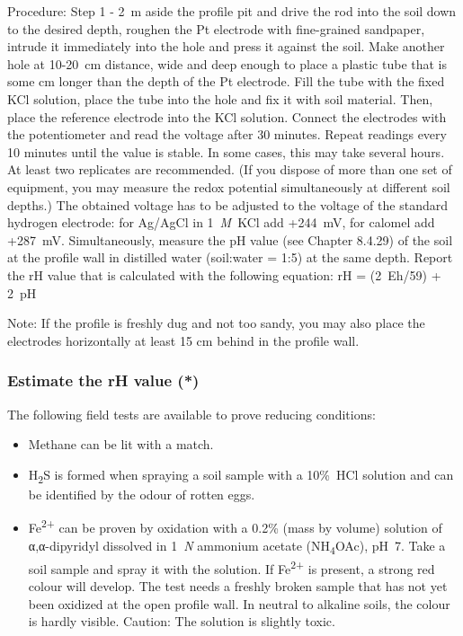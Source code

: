 \documentclass[
  letterpaper,
  DIV=11,
  numbers=noendperiod]{scrreprt}
\providecommand{\tightlist}{%
  \setlength{\itemsep}{0pt}\setlength{\parskip}{0pt}}\usepackage{longtable,booktabs,array}
\begin{document}
Procedure: Step 1 - 2~m aside the profile pit and drive the rod into the
soil down to the desired depth, roughen the Pt electrode with
fine-grained sandpaper, intrude it immediately into the hole and press
it against the soil. Make another hole at 10-20~cm distance, wide and
deep enough to place a plastic tube that is some cm longer than the
depth of the Pt electrode. Fill the tube with the fixed KCl solution,
place the tube into the hole and fix it with soil material. Then, place
the reference electrode into the KCl solution. Connect the electrodes
with the potentiometer and read the voltage after 30 minutes. Repeat
readings every 10 minutes until the value is stable. In some cases, this
may take several hours. At least two replicates are recommended. (If you
dispose of more than one set of equipment, you may measure the redox
potential simultaneously at different soil depths.) The obtained voltage
has to be adjusted to the voltage of the standard hydrogen electrode:
for Ag/AgCl in 1~\emph{M}~KCl add +244~mV, for calomel add +287~mV.
Simultaneously, measure the pH value (see Chapter 8.4.29) of the soil at
the profile wall in distilled water (soil:water = 1:5) at the same
depth. Report the rH value that is calculated with the following
equation: rH = (2~Eh/59) + 2~pH

Note: If the profile is freshly dug and not too sandy, you may also
place the electrodes horizontally at least 15 cm behind in the profile
wall.

\hypertarget{estimate-the-rh-value}{%
\subsubsection{Estimate the rH value (*)}\label{estimate-the-rh-value}}

The following field tests are available to prove reducing conditions:

\begin{itemize}
\tightlist
\item
  Methane can be lit with a match.
\item
  H\textsubscript{2}S is formed when spraying a soil sample with a
  10\%~HCl solution and can be identified by the odour of rotten eggs.
\item
  Fe\textsuperscript{2+} can be proven by oxidation with a 0.2\% (mass
  by volume) solution of α,α-dipyridyl dissolved in 1~\emph{N} ammonium
  acetate (NH\textsubscript{4}OAc), pH~7. Take a soil sample and spray
  it with the solution. If Fe\textsuperscript{2+} is present, a strong
  red colour will develop. The test needs a freshly broken sample that
  has not yet been oxidized at the open profile wall. In neutral to
  alkaline soils, the colour is hardly visible. Caution: The solution is
  slightly toxic.
\end{itemize}
\end{document}
